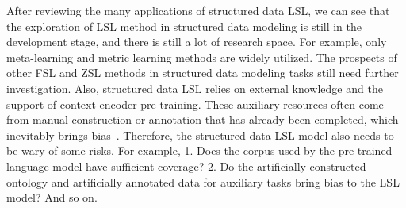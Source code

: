 After reviewing the many applications of structured data LSL, we can see that the exploration of LSL method in structured data modeling is still in the development stage, and there is still a lot of research space. For example, only meta-learning and metric learning methods are widely utilized. The prospects of other FSL and ZSL methods in structured data modeling tasks still need further investigation. Also, structured data LSL relies on external knowledge and the support of context encoder pre-training. These auxiliary resources often come from manual construction or annotation that has already been completed, which inevitably brings bias~. Therefore, the structured data LSL model also needs to be wary of some risks. For example, 1. Does the corpus used by the pre-trained language model have sufficient coverage? 2. Do the artificially constructed ontology and artificially annotated data for auxiliary tasks bring bias to the LSL model? And so on.

